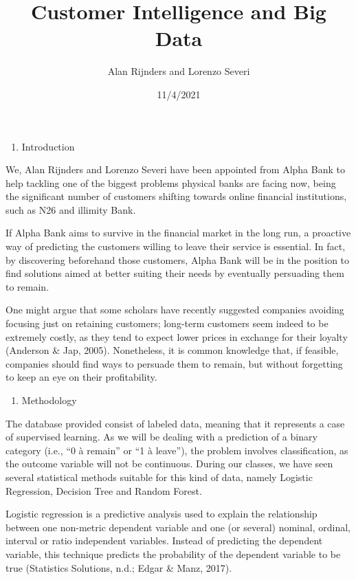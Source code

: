 \documentclass[
]{article}
\title{Customer Intelligence and Big Data}
\author{Alan Rijnders and Lorenzo Severi}
\date{11/4/2021}
\providecommand{\tightlist}{%
  \setlength{\itemsep}{0pt}\setlength{\parskip}{0pt}}
\begin{document}
\maketitle

\begin{enumerate}
\def\labelenumi{\arabic{enumi}.}
\tightlist
\item
  Introduction
\end{enumerate}

We, Alan Rijnders and Lorenzo Severi have been appointed from Alpha Bank
to help tackling one of the biggest problems physical banks are facing
now, being the significant number of customers shifting towards online
financial institutions, such as N26 and illimity Bank.

If Alpha Bank aims to survive in the financial market in the long run, a
proactive way of predicting the customers willing to leave their service
is essential. In fact, by discovering beforehand those customers, Alpha
Bank will be in the position to find solutions aimed at better suiting
their needs by eventually persuading them to remain.

One might argue that some scholars have recently suggested companies
avoiding focusing just on retaining customers; long-term customers seem
indeed to be extremely costly, as they tend to expect lower prices in
exchange for their loyalty (Anderson \& Jap, 2005). Nonetheless, it is
common knowledge that, if feasible, companies should find ways to
persuade them to remain, but without forgetting to keep an eye on their
profitability.

\begin{enumerate}
\def\labelenumi{\arabic{enumi}.}
\setcounter{enumi}{1}
\tightlist
\item
  Methodology
\end{enumerate}

The database provided consist of labeled data, meaning that it
represents a case of supervised learning. As we will be dealing with a
prediction of a binary category (i.e., ``0 à remain'' or ``1 à leave''),
the problem involves classification, as the outcome variable will not be
continuous. During our classes, we have seen several statistical methods
suitable for this kind of data, namely Logistic Regression, Decision
Tree and Random Forest.

Logistic regression is a predictive analysis used to explain the
relationship between one non-metric dependent variable and one (or
several) nominal, ordinal, interval or ratio independent variables.
Instead of predicting the dependent variable, this technique predicts
the probability of the dependent variable to be true (Statistics
Solutions, n.d.; Edgar \& Manz, 2017).
\end{document}
